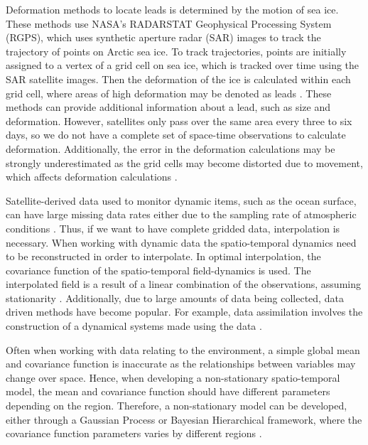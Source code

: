 \documentclass[12pt]{article}
\begin{document}
Deformation methods to locate leads is determined by the motion of sea
ice. These methods use NASA's RADARSTAT Geophysical Processing System
(RGPS), which uses synthetic aperture radar (SAR) images to track the
trajectory of points on Arctic sea ice. To track trajectories, points
are initially assigned to a vertex of a grid cell on sea ice, which is
tracked over time using the SAR satellite images. Then the deformation
of the ice is calculated within each grid cell, where areas of high
deformation may be denoted as leads \citep{peterson_evaluating_2011}.
These methods can provide additional information about a lead, such as
size and deformation. However, satellites only pass over the same area
every three to six days, so we do not have a complete set of space-time
observations to calculate deformation. Additionally, the error in the
deformation calculations may be strongly underestimated as the grid
cells may become distorted due to movement, which affects deformation
calculations \citep{bouillon_producing_2015}.

Satellite-derived data used to monitor dynamic items, such as the ocean
surface, can have large missing data rates either due to the sampling
rate of atmospheric conditions \citep{fablet_data-driven_2017}. Thus, if
we want to have complete gridded data, interpolation is necessary. When
working with dynamic data the spatio-temporal dynamics need to be
reconstructed in order to interpolate. In optimal interpolation, the
covariance function of the spatio-temporal field-dynamics is used. The
interpolated field is a result of a linear combination of the
observations, assuming stationarity
\citep{fablet_data-driven_2017, ouala_neural_2018}. Additionally, due to
large amounts of data being collected, data driven methods have become
popular. For example, data assimilation involves the construction of a
dynamical systems made using the data
\citep{li_variational_2015, fablet_data-driven_2017, ouala_neural_2018}.

Often when working with data relating to the environment, a simple
global mean and covariance function is inaccurate as the relationships
between variables may change over space. Hence, when developing a
non-stationary spatio-temporal model, the mean and covariance function
should have different parameters depending on the region. Therefore, a
non-stationary model can be developed, either through a Gaussian Process
or Bayesian Hierarchical framework, where the covariance function
parameters varies by different regions
\citep{guinness_nonstationary_2013, SALVANA2020100411}.
\end{document}
